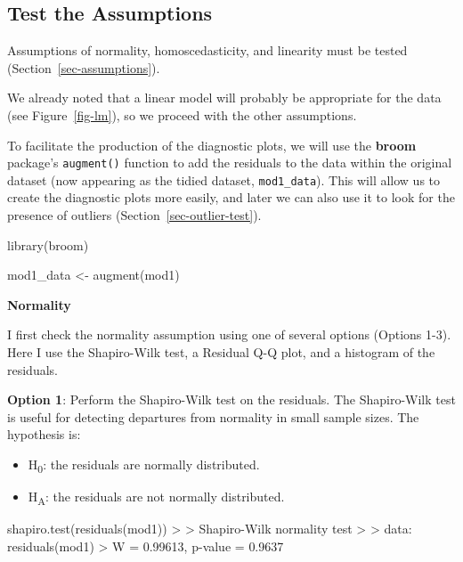 \documentclass[
  letterpaper,
]{book}
\newenvironment{Shaded}{\begin{snugshade}}{\end{snugshade}}
\newcommand{\ErrorTok}[1]{\textcolor[rgb]{0.68,0.00,0.00}{#1}}
\newcommand{\FloatTok}[1]{\textcolor[rgb]{0.68,0.00,0.00}{#1}}
\newcommand{\FunctionTok}[1]{\textcolor[rgb]{0.28,0.35,0.67}{#1}}
\newcommand{\NormalTok}[1]{\textcolor[rgb]{0.00,0.23,0.31}{#1}}
\newcommand{\OtherTok}[1]{\textcolor[rgb]{0.00,0.23,0.31}{#1}}
\newcommand{\SpecialCharTok}[1]{\textcolor[rgb]{0.37,0.37,0.37}{#1}}
\providecommand{\tightlist}{%
  \setlength{\itemsep}{0pt}\setlength{\parskip}{0pt}}\usepackage{longtable,booktabs,array}
\begin{document}
\subsection{Test the Assumptions}\label{test-the-assumptions}

Assumptions of normality, homoscedasticity, and linearity must be tested
(Section~\ref{sec-assumptions}).

We already noted that a linear model will probably be appropriate for
the data (see Figure~\ref{fig-lm}), so we proceed with the other
assumptions.

To facilitate the production of the diagnostic plots, we will use the
\textbf{broom} package's \texttt{augment()} function to add the
residuals to the data within the original dataset (now appearing as the
tidied dataset, \texttt{mod1\_data}). This will allow us to create the
diagnostic plots more easily, and later we can also use it to look for
the presence of outliers (Section~\ref{sec-outlier-test}).

\begin{Shaded}
\begin{Highlighting}[]
\FunctionTok{library}\NormalTok{(broom)}

\NormalTok{mod1\_data }\OtherTok{\textless{}{-}} \FunctionTok{augment}\NormalTok{(mod1)}
\end{Highlighting}
\end{Shaded}

\textbf{Normality}

I first check the normality assumption using one of several options
(Options 1-3). Here I use the Shapiro-Wilk test, a Residual Q-Q plot,
and a histogram of the residuals.

\textbf{Option 1}: Perform the Shapiro-Wilk test on the residuals. The
Shapiro-Wilk test is useful for detecting departures from normality in
small sample sizes. The hypothesis is:

\begin{itemize}
\tightlist
\item
  H\textsubscript{0}: the residuals are normally distributed.
\item
  H\textsubscript{A}: the residuals are not normally distributed.
\end{itemize}

\begin{Shaded}
\begin{Highlighting}[]
\FunctionTok{shapiro.test}\NormalTok{(}\FunctionTok{residuals}\NormalTok{(mod1))}
\SpecialCharTok{\textgreater{}} 
\ErrorTok{\textgreater{}}\NormalTok{   Shapiro}\SpecialCharTok{{-}}\NormalTok{Wilk normality test}
\SpecialCharTok{\textgreater{}} 
\ErrorTok{\textgreater{}}\NormalTok{ data}\SpecialCharTok{:}  \FunctionTok{residuals}\NormalTok{(mod1)}
\SpecialCharTok{\textgreater{}}\NormalTok{ W }\OtherTok{=} \FloatTok{0.99613}\NormalTok{, p}\SpecialCharTok{{-}}\NormalTok{value }\OtherTok{=} \FloatTok{0.9637}
\end{Highlighting}
\end{Shaded}
\end{document}
